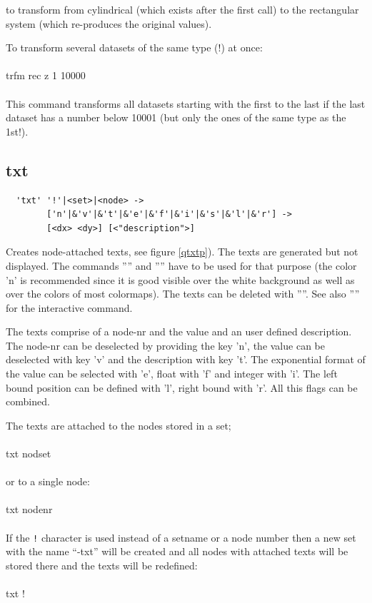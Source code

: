 \documentclass{article}
\begin{document}
to transform from cylindrical (which exists after the first call) to 
the rectangular system (which re-produces the original values).

To transform several datasets of the same type (!) at once:\\\\

trfm rec z 1 10000\\\\

This command transforms all datasets starting with the first to the last if the 
last dataset has a number below 10001 (but only the ones of the same type as 
the 1st!).

\subsection{\label{txt}txt}
\begin{verbatim}
  'txt' '!'|<set>|<node> ->
        ['n'|&'v'|&'t'|&'e'|&'f'|&'i'|&'s'|&'l'|&'r'] ->
        [<dx> <dy>] [<"description">]
\end{verbatim}
Creates node-attached texts, see figure \ref{qtxtp}). The texts are generated but not displayed. The commands '''' and '''' have to be used for that purpose (the color 'n' is recommended since it is good visible over the white background as well as over the colors of most colormaps). The texts can be deleted with ''''. See also '''' for the interactive command.

The texts comprise of a node-nr and the value and an user defined description. The node-nr can be deselected by providing the key 'n', the value can be deselected with key 'v' and the description with key 't'. The exponential format of the value can be selected with 'e', float with 'f' and integer with 'i'. The left bound position can be defined with 'l', right bound with 'r'. All this flags can be combined.

The texts are attached to the nodes stored in a set;\\\\txt nodset\\\\or to a single node:\\\\txt nodenr\\\\If the \verb_!_ character is used instead of a setname or a node number then a new set with the name ``-txt'' will be created and all nodes with attached texts will be stored there and the texts will be redefined:\\\\txt !\\\\
\end{document}
